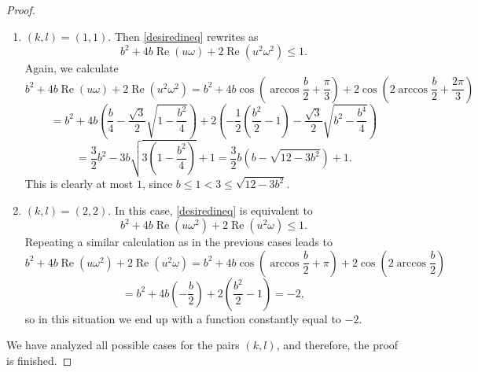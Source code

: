 \documentclass[10pt,a4paper]{amsart}
\DeclareMathOperator{\re}{Re}
\begin{document}
\begin{proof}
\begin{enumerate}
\item $(k, l)=(1, 1)$. Then \eqref{desiredineq} rewrites as
$$b^2 + 4b\re(u\omega) + 2 \re(u^2 \omega^2) \leq 1.$$
Again, we calculate
$$b^2 + 4b\re(u\omega) + 2 \re(u^2 \omega^2) = b^2 + 4b \cos \left ( \arccos{\frac{b}{2}} + \frac{\pi}{3}  \right ) + 2 \cos \left ( 2\arccos{\frac{b}{2}} + \frac{2\pi}{3}  \right )$$
$$=b^2 + 4b \left ( \frac{b}{4} - \frac{\sqrt{3}}{2} \sqrt{1 - \frac{b^2}{4}} \right ) + 2 \left ( - \frac{1}{2}  \left ( \frac{b^2}{2} - 1 \right )  -  \frac{\sqrt{3}}{2} \sqrt{b^2 - \frac{b^4}{4}} \right )$$
$$= \frac{3}{2}b^2 - 3b\sqrt{3\left ( 1 - \frac{b^2}{4} \right )} + 1 = \frac{3}{2} b \left ( b - \sqrt{12-3b^2} \right ) + 1.$$
This is clearly at most $1$, since $b \leq 1 < 3 \leq \sqrt{12-3b^2}$.
\item $(k, l)=(2, 2)$. In this case, \eqref{desiredineq} is equivalent to
$$b^2 + 4b\re(u\omega^2) + 2 \re(u^2 \omega) \leq 1.$$
Repeating a similar calculation as in the previous cases leads to
$$b^2 + 4b\re(u\omega^2) + 2 \re(u^2 \omega) = b^2 + 4b\cos \left ( \arccos{\frac{b}{2}} + \pi  \right ) + 2 \cos \left ( 2\arccos{\frac{b}{2}} \right )$$
$$=b^2 + 4b \left ( -\frac{b}{2} \right ) + 2 \left ( \frac{b^2}{2}-1 \right )=-2,$$
so in this situation we end up with a function constantly equal to $-2$.

\end{enumerate}

We have analyzed all possible cases for the pairs $(k, l)$, and therefore, the proof is finished.
\end{proof}
\end{document}
